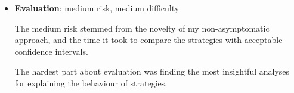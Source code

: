 \begin{itemize}
    \item \textbf{Evaluation}: \textcolor{YellowOrange}{medium risk}, \textcolor{YellowOrange}{medium difficulty}
    
    The medium risk stemmed from the novelty of my non-asymptomatic approach, and the time it took to compare the strategies with acceptable confidence intervals.
    
    The hardest part about evaluation was finding the most insightful analyses for explaining the behaviour of strategies.
    
    
\end{itemize}